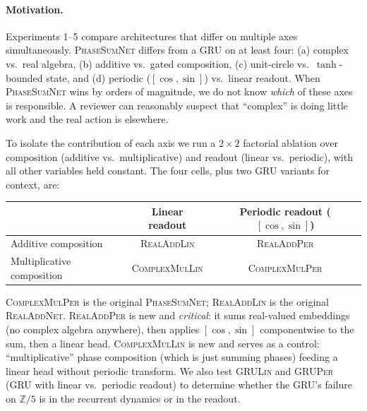 \documentclass[11pt]{article}
\theoremstyle{definition}
\newcommand{\Z}{\mathbb{Z}}
\begin{document}
\paragraph{Motivation.} Experiments 1--5 compare architectures that
differ on multiple axes simultaneously. \textsc{PhaseSumNet} differs
from a GRU on at least four: (a) complex vs.\ real algebra, (b)
additive vs.\ gated composition, (c) unit-circle vs.\ $\tanh$-bounded
state, and (d) periodic ($[\cos,\sin]$) vs.\ linear readout. When
\textsc{PhaseSumNet} wins by orders of magnitude, we do not know
\emph{which} of these axes is responsible. A reviewer can reasonably
suspect that ``complex'' is doing little work and the real action
is elsewhere.

To isolate the contribution of each axis we run a $2\times 2$
factorial ablation over composition (additive vs.\ multiplicative)
and readout (linear vs.\ periodic), with all other variables held
constant. The four cells, plus two GRU variants for context, are:

\begin{center}
\begin{tabular}{l|cc}
\toprule
& Linear readout & Periodic readout ($[\cos,\sin]$) \\
\midrule
Additive composition       & \textsc{RealAddLin}    & \textsc{RealAddPer} \\
Multiplicative composition & \textsc{ComplexMulLin} & \textsc{ComplexMulPer} \\
\bottomrule
\end{tabular}
\end{center}

\textsc{ComplexMulPer} is the original \textsc{PhaseSumNet};
\textsc{RealAddLin} is the original \textsc{RealAddNet}.
\textsc{RealAddPer} is new and \emph{critical}: it sums real-valued
embeddings (no complex algebra anywhere), then applies $[\cos,\sin]$
componentwise to the sum, then a linear head. \textsc{ComplexMulLin}
is new and serves as a control: ``multiplicative'' phase composition
(which is just summing phases) feeding a linear head without
periodic transform. We also test \textsc{GRULin} and \textsc{GRUPer}
(GRU with linear vs.\ periodic readout) to determine whether the
GRU's failure on $\Z/5$ is in the recurrent dynamics or in the
readout.
\end{document}
